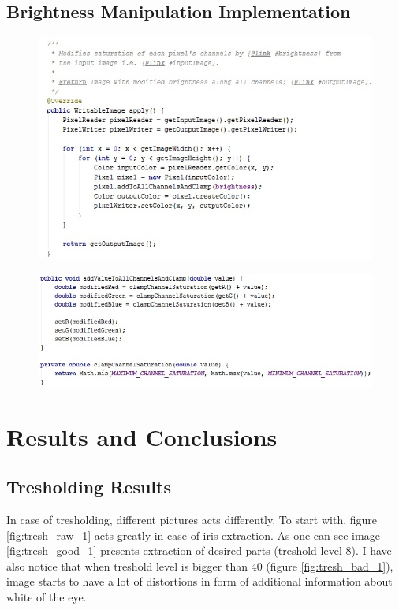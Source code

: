 \documentclass{article}
\begin{document}
\subsection*{Brightness Manipulation Implementation}
\begin{figure}[H]
	\centering
	\includegraphics[width=1\textwidth]{_Figures/brigthness_function.jpg}
\end{figure}

\begin{figure}[H]
	\centering
	\includegraphics[width=1\textwidth]{_Figures/brighthness_clamp.jpg}
\end{figure}


\section{Results and Conclusions}

%
%
\subsection{Tresholding Results}
In case of tresholding, different pictures acts differently. To start with, figure \ref{fig:tresh_raw_1} acts greatly in case of iris extraction. As one can see image \ref{fig:tresh_good_1} presents extraction of  desired parts (treshold level 8). I have also notice that when treshold level is bigger than 40 (figure \ref{fig:tresh_bad_1}), image starts to have a lot of distortions in form of additional information about white of the eye.
\end{document}
